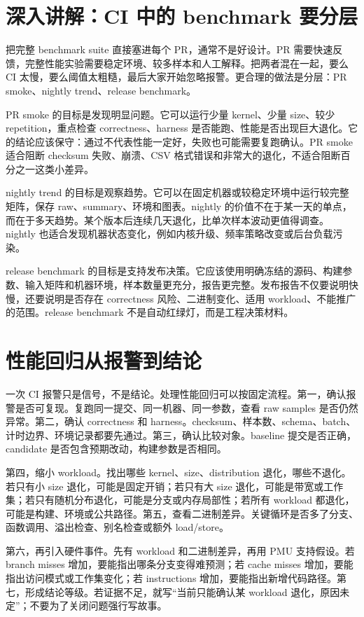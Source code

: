 \section{深入讲解：CI 中的 benchmark 要分层}

把完整 benchmark suite 直接塞进每个 PR，通常不是好设计。PR 需要快速反馈，完整性能实验需要稳定环境、较多样本和人工解释。把两者混在一起，要么 CI 太慢，要么阈值太粗糙，最后大家开始忽略报警。更合理的做法是分层：PR smoke、nightly trend、release benchmark。

PR smoke 的目标是发现明显问题。它可以运行少量 kernel、少量 size、较少 repetition，重点检查 correctness、harness 是否能跑、性能是否出现巨大退化。它的结论应该保守：通过不代表性能一定好，失败也可能需要复跑确认。PR smoke 适合阻断 checksum 失败、崩溃、CSV 格式错误和非常大的退化，不适合阻断百分之一这类小差异。

nightly trend 的目标是观察趋势。它可以在固定机器或较稳定环境中运行较完整矩阵，保存 raw、summary、环境和图表。nightly 的价值不在于某一天的单点，而在于多天趋势。某个版本后连续几天退化，比单次样本波动更值得调查。nightly 也适合发现机器状态变化，例如内核升级、频率策略改变或后台负载污染。

release benchmark 的目标是支持发布决策。它应该使用明确冻结的源码、构建参数、输入矩阵和机器环境，样本数量更充分，报告更完整。发布报告不仅要说明快慢，还要说明是否存在 correctness 风险、二进制变化、适用 workload、不能推广的范围。release benchmark 不是自动红绿灯，而是工程决策材料。

\section{性能回归从报警到结论}

一次 CI 报警只是信号，不是结论。处理性能回归可以按固定流程。第一，确认报警是否可复现。复跑同一提交、同一机器、同一参数，查看 raw samples 是否仍然异常。第二，确认 correctness 和 harness。checksum、样本数、schema、batch、计时边界、环境记录都要先通过。第三，确认比较对象。baseline 提交是否正确，candidate 是否包含预期改动，构建参数是否相同。

第四，缩小 workload。找出哪些 kernel、size、distribution 退化，哪些不退化。若只有小 size 退化，可能是固定开销；若只有大 size 退化，可能是带宽或工作集；若只有随机分布退化，可能是分支或内存局部性；若所有 workload 都退化，可能是构建、环境或公共路径。第五，查看二进制差异。关键循环是否多了分支、函数调用、溢出检查、别名检查或额外 load/store。

第六，再引入硬件事件。先有 workload 和二进制差异，再用 PMU 支持假设。若 branch misses 增加，要能指出哪条分支变得难预测；若 cache misses 增加，要能指出访问模式或工作集变化；若 instructions 增加，要能指出新增代码路径。第七，形成结论等级。若证据不足，就写“当前只能确认某 workload 退化，原因未定”；不要为了关闭问题强行写故事。

